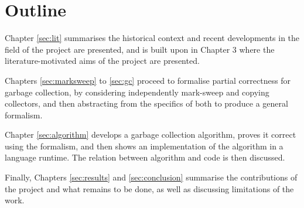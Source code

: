 \section{Outline}
\label{sec:intro-outline}

Chapter \ref{sec:lit} summarises the historical context and recent
developments in the field of the project are presented, and is built
upon in Chapter 3 where the literature-motivated aims of the project
are presented.

Chapters \ref{sec:marksweep} to \ref{sec:gc} proceed to formalise
partial correctness for garbage collection, by considering
independently mark-sweep and copying collectors, and then abstracting
from the specifics of both to produce a general formalism.

Chapter \ref{sec:algorithm} develops a garbage collection algorithm,
proves it correct using the formalism, and then shows an
implementation of the algorithm in a language runtime. The relation
between algorithm and code is then discussed.

Finally, Chapters \ref{sec:results} and \ref{sec:conclusion} summarise
the contributions of the project and what remains to be done, as well
as discussing limitations of the work.
